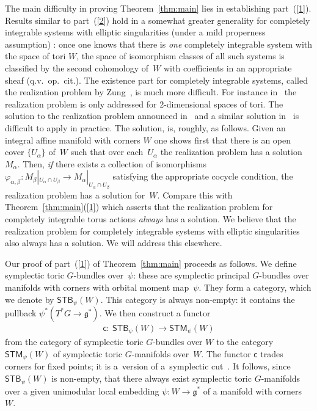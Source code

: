 \documentclass[10pt,a4paper]{amsart}
\numberwithin{equation}{section}
\begin{document}
The main dif\/f\/iculty in proving Theorem~\ref{thm:main} lies in establishing
part~(\ref{1}).
Results similar to part~(\ref{2}) hold in a somewhat greater generality
for completely integrable systems with elliptic singularities
(under a mild properness assumption) \cite{BM, Y, Z}:
once one knows that
there is {\it one} completely integrable system with the space of
tori $W$, the space of isomorphism classes of all such systems
is classif\/ied by the
second cohomology of~$W$ with coef\/f\/icients in an appropriate sheaf
(q.v.\ op.\ cit.).  The existence part for completely integrable
systems, called the realization problem by Zung~\cite{Z}, is much more
dif\/f\/icult.  For instance in~\cite{Z} the realization problem is only
addressed for 2-dimensional spaces of tori.  The solution to the
realization problem announced in~\cite{BM} and a similar solution in~\cite{Y} is dif\/f\/icult to apply in practice.
The solution, is, roughly, as follows.  Given an integral af\/f\/ine
manifold with corners $W$ one shows f\/irst that there is an open cover
$\{U_\alpha\}$ of~$W$ such that over each~$U_\alpha$ the realization
problem has a solution~$M_\alpha$.  Then, {\it if} there exists a
collection of isomorphisms $\varphi_{\alpha,\beta}\colon M_\beta|_{U_\alpha
  \cap U_\beta}\to M_\alpha|_{U_\alpha \cap U_\beta}$ satisfying the
appropriate cocycle condition, the realization problem has a solution
for~$W$.  Compare this with Theorem~\ref{thm:main}(\ref{1}) which
asserts that the realization problem for completely integrable torus
actions {\it always} has a solution.  We believe that the realization
problem for completely integrable systems with elliptic singularities
also always has a solution.  We will address this elsewhere.

Our proof of  part~(\ref{1}) of Theorem~\ref{thm:main} proceeds as follows.
We def\/ine symplectic toric $G$-bundles over~$\psi$:
these are
symplectic principal $G$-bundles over manifolds with corners
with orbital moment map~$\psi$.
They form a category, which we denote by ${\textsf{STB}}_\psi (W)$.
This category is always non-empty:
it contains the pullback $\psi^*(T^*G\to {\mathfrak g}^*)$.
We then construct a functor
\begin{gather} \label{collapse 0}
 {\textsf{c}} \colon \  {\textsf{STB}}_{\psi}(W)   \to
                   {\textsf{STM}}_{\psi}(W)
\end{gather}
from the category of symplectic toric $G$-bundles over $W$ to the
category ${\textsf{STM}}_{\psi}(W)$ of symplectic toric $G$-manifolds over~$W$.
The functor
${\textsf{c}}$ trades corners for f\/ixed points; it is a~version of a~symplectic cut~\cite{Lcuts}.  It follows, since
${\textsf{STB}}_\psi (W)$ is non-empty, that there always
exist symplectic toric $G$-manifolds
over a given unimodular local embedding $\psi\colon W \to {\mathfrak g}^*$
of a manifold with corners~$W$.
\end{document}
